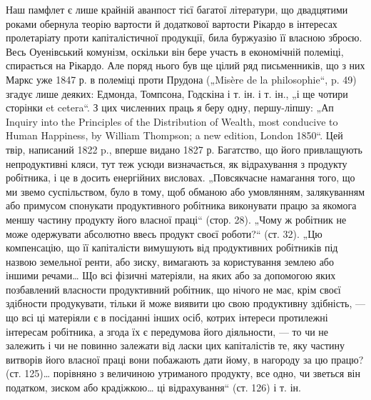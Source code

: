 Наш памфлет є лише крайній аванпост тієї багатої літератури, що
двадцятими роками обернула теорію вартости й додаткової вартости
Рікардо в інтересах пролетаріату проти капіталістичної продукції, била
буржуазію її власною зброєю. Весь Оуенівський комунізм, оскільки він
бере участь в економічній полеміці, спирається на Рікардо. Але поряд
нього був ще цілий ряд письменників, що з них Маркс уже 1847 р. в
полеміці проти Прудона („Misère de la philosophie“, p. 49) згадує лише деяких:
Едмонда, Томпсона, Годскіна і т. ін. і т. ін., „і ще чотири сторінки et
cetera“. З цих численних праць я беру одну, першу-ліпшу: „Ап Inquiry
into the Principles of the Distribution of Wealth, most conducive to Human
Happiness, by William Thompson; a new edition, London 1850“. Цей твір,
написаний 1822 p., вперше видано 1827 р. Багатство, що його привлащують
непродуктивні кляси, тут теж усюди визначається, як відрахування з
продукту робітника, і це в досить енергійних висловах. „Повсякчасне
намагання того, що ми звемо суспільством, було в тому, щоб обманою
або умовлянням, залякуванням або примусом спонукати продуктивного
робітника виконувати працю за якомога меншу частину продукту його
власної праці“ (стор. 28). „Чому ж робітник не може одержувати абсолютно
ввесь продукт своєї роботи?“ (ст. 32). „Цю компенсацію, що її
капіталісти вимушують від продуктивних робітників під назвою земельної
ренти, або зиску, вимагають за користування землею або іншими речами\dots{}
Що всі фізичні матеріяли, на яких або за допомогою яких позбавлений
власности продуктивний робітник, що нічого не має, крім своєї здібности
продукувати, тільки й може виявити цю свою продуктивну здібність, —
що всі ці матеріяли є в посіданні інших осіб, котрих інтереси протилежні
інтересам робітника, а згода їх є передумова його діяльности, — то чи не
залежить і чи не повинно залежати від ласки цих капіталістів те, яку
частину витворів його власної праці вони побажають дати йому, в
нагороду за цю працю? (ст. 125)\dots{} порівняно з величиною утриманого
продукту, все одно, чи зветься він податком, зиском або крадіжкою\dots{}
ці відрахування“ (ст. 126) і т. ін.
